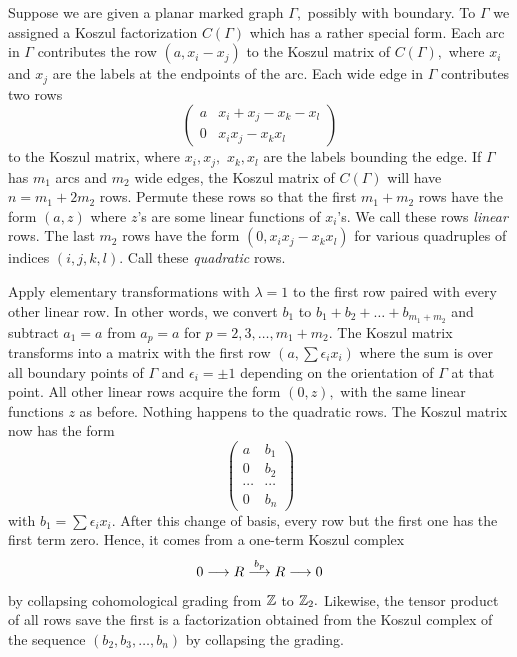 \documentclass[12pt]{article}
\begin{document}
Suppose we are given a planar marked graph $\Gamma,$ possibly with 
boundary. To $\Gamma$ we assigned a Koszul factorization $C(\Gamma)$
which has a rather special form. Each arc in $\Gamma$ contributes the  
row $(a , x_i-x_j)$ to the Koszul matrix of $C(\Gamma),$ where $x_i$ and 
$x_j$ are the labels at the endpoints of the arc. Each wide edge in $\Gamma$ 
contributes two rows 
$$\left( \begin{array}{cc}  a & x_i + x_j -x_k -x_l \\
                                           0  & x_i x_j - x_k x_l 
    \end{array} \right) $$
to the Koszul matrix, where $x_i, x_j,$ $x_k, x_l$ are the labels bounding 
the edge. If $\Gamma$ has $m_1$ arcs and $m_2$ wide edges, the Koszul 
matrix of $C(\Gamma)$ will have $n=m_1+2m_2$ rows. Permute these rows 
so that the first $m_1+m_2$ rows have the form $(a, z)$ where $z$'s are 
some linear functions of $x_i$'s. We call these rows \emph{linear} rows. 
The last $m_2$ rows have the form 
$(0 ,  x_i x_j - x_k x_l)$ for various quadruples of indices 
$(i,j,k,l).$ Call these \emph{quadratic} rows. 
 
Apply elementary transformations with $\lambda=1$ to the first row 
paired with every other linear row. In other words, we convert $b_1$ to 
$b_1+b_2+\dots + b_{m_1+m_2}$ and subtract $a_1=a$ from $a_p=a$ 
for $p=2,3,\dots, m_1+m_2.$ The Koszul matrix transforms 
into a matrix with the first row $(a, \sum \epsilon_i x_i)$ where 
the sum is over all boundary points of $\Gamma$ and $\epsilon_i = \pm 1$ 
depending on the orientation of $\Gamma$ at that point. All other linear 
rows acquire the form $(0, z),$ with the same linear functions $z$ as 
before. Nothing happens to the quadratic rows. The Koszul matrix now 
has the form 
$$\left( \begin{array}{cc} a  &  b_1 \\ 0 & b_2 \\ \cdots & \cdots \\
  0  & b_n \end{array} \right)$$
with $b_1= \sum \epsilon_i x_i.$
After this change of basis, every row but the first one has the 
first term zero. Hence, it comes from a one-term Koszul complex 
$$0 \longrightarrow R \stackrel{b_p}{\longrightarrow} R\longrightarrow 0$$ 
by collapsing cohomological grading from $\mathbb Z$ to $\mathbb Z_2.$ 
Likewise, the tensor product of all rows save the first is a factorization 
obtained from the Koszul complex of the sequence $(b_2, b_3,\dots , b_n)$ 
by collapsing the grading. 
\end{document}
